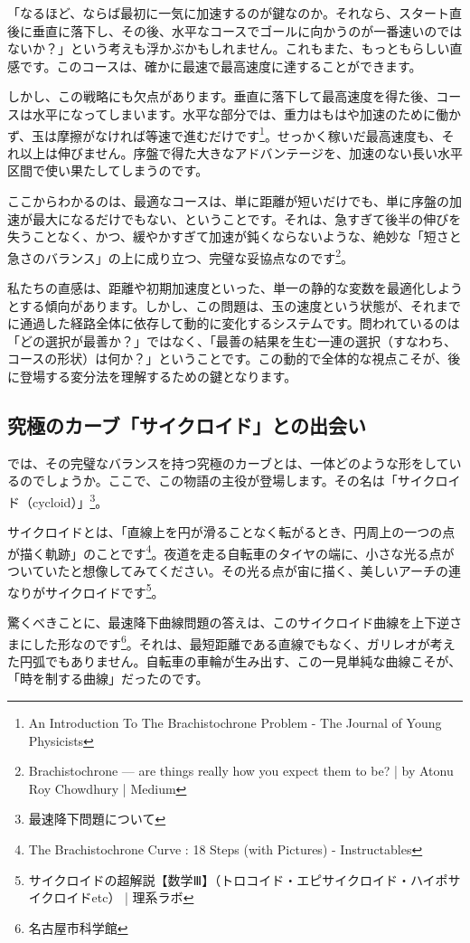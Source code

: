 \documentclass[a4paper,12pt]{bxjsarticle}
\begin{document}
「なるほど、ならば最初に一気に加速するのが鍵なのか。それなら、スタート直後に垂直に落下し、その後、水平なコースでゴールに向かうのが一番速いのではないか？」という考えも浮かぶかもしれません。これもまた、もっともらしい直感です。このコースは、確かに最速で最高速度に達することができます。

しかし、この戦略にも欠点があります。垂直に落下して最高速度を得た後、コースは水平になってしまいます。水平な部分では、重力はもはや加速のために働かず、玉は摩擦がなければ等速で進むだけです\footnote{An Introduction To The Brachistochrone Problem - The Journal of Young Physicists}。せっかく稼いだ最高速度も、それ以上は伸びません。序盤で得た大きなアドバンテージを、加速のない長い水平区間で使い果たしてしまうのです。

ここからわかるのは、最適なコースは、単に距離が短いだけでも、単に序盤の加速が最大になるだけでもない、ということです。それは、急すぎて後半の伸びを失うことなく、かつ、緩やかすぎて加速が鈍くならないような、絶妙な「短さと急さのバランス」の上に成り立つ、完璧な妥協点なのです\footnote{Brachistochrone — are things really how you expect them to be? | by Atonu Roy Chowdhury | Medium}。

私たちの直感は、距離や初期加速度といった、単一の静的な変数を最適化しようとする傾向があります。しかし、この問題は、玉の速度という状態が、それまでに通過した経路全体に依存して動的に変化するシステムです。問われているのは「どの選択が最善か？」ではなく、「最善の結果を生む一連の選択（すなわち、コースの形状）は何か？」ということです。この動的で全体的な視点こそが、後に登場する変分法を理解するための鍵となります。

\subsection{究極のカーブ「サイクロイド」との出会い}

では、その完璧なバランスを持つ究極のカーブとは、一体どのような形をしているのでしょうか。ここで、この物語の主役が登場します。その名は「サイクロイド（cycloid）」\footnote{最速降下問題について}。

サイクロイドとは、「直線上を円が滑ることなく転がるとき、円周上の一つの点が描く軌跡」のことです\footnote{The Brachistochrone Curve : 18 Steps (with Pictures) - Instructables}。夜道を走る自転車のタイヤの端に、小さな光る点がついていたと想像してみてください。その光る点が宙に描く、美しいアーチの連なりがサイクロイドです\footnote{サイクロイドの超解説【数学Ⅲ】（トロコイド・エピサイクロイド・ハイポサイクロイドetc） | 理系ラボ}。

驚くべきことに、最速降下曲線問題の答えは、このサイクロイド曲線を上下逆さまにした形なのです\footnote{名古屋市科学館}。それは、最短距離である直線でもなく、ガリレオが考えた円弧でもありません。自転車の車輪が生み出す、この一見単純な曲線こそが、「時を制する曲線」だったのです。
\end{document}
